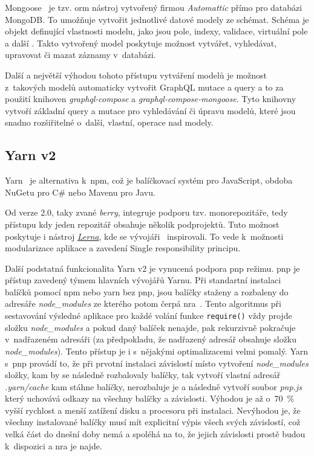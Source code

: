 Mongoose~\cite{automatticinc_2011_mongoose} je tzv. \acrfull{orm} nástroj vytvořený firmou \emph{Automattic} přímo pro databázi MongoDB. To umožňuje vytvořit jednotlivé datové modely ze schémat. Schéma je objekt definující vlastnosti modelu, jako jsou pole, indexy, validace, virtuální pole a další \cite{automatticinc_2020_mongoose}. Takto vytvořený model poskytuje možnost vytvářet, vyhledávat, upravovat či mazat záznamy v~databázi.

Další a největší výhodou tohoto přístupu vytváření modelů je možnost z~takových modelů automaticky vytvořit GraphQL mutace a query a to za použití knihoven \emph{graphql-compose} a \emph{graphql-compose-mongoose}. Tyto knihovny vytvoří základní query a mutace pro vyhledávání či úpravu modelů, které jsou snadno rozšiřitelné o~další, vlastní, operace nad modely.

\subsection{Yarn v2}
\label{ss:yarn}
Yarn~\cite{facebookinc_2019_yarn} je alternativa k~\acrshort{npm}, což je balíčkovací systém pro JavaScript, obdoba NuGetu pro C\# nebo Mavenu pro Javu.

Od verze 2.0, taky zvané \emph{berry}, integruje podporu tzv. monorepozitáře, tedy přístupu kdy jeden repozitář obsahuje několik podprojektů. Tuto možnost poskytuje i nástroj \href{https://github.com/lerna/lerna}{\emph{Lerna}}, kde se vývojáři~ inspirovali. To vede k~možnosti modularizace aplikace a zavedení Single responsibility principu.

Další podstatná funkcionalita Yarn v2 je vynucená podpora \acrfull{pnp} režimu. \acrshort{pnp} je přístup zavedený týmem hlavních vývojářů Yarnu. Při standartní instalaci balíčků pomocí npm nebo yarn bez pnp, jsou balíčky staženy a rozbaleny do adresáře \emph{node\_modules} ze kterého potom čerpá \acrfull{nra}~\cite{joyentinc_1_noderesolutionalgorithm}. Tento algoritmus při sestavování výsledné aplikace pro každé volání funkce \texttt{require()} vždy projde složku \emph{node\_modules} a pokud daný balíček nenajde, pak rekurzivně pokračuje v~nadřazeném adresáři (za předpokladu, že nadřazený adresář obsahuje složku \emph{node\_modules}). Tento přístup je i s~nějakými optimalizacemi velmi pomalý. Yarn s~\acrshort{pnp} provádí to, že při prvotní instalaci závislostí místo vytvoření \emph{node\_modules} složky, kam by se následně rozbalovaly balíčky, tak vytvoří vlastní adresář \emph{.yarn/cache} kam stáhne balíčky, nerozbaluje je a následně vytvoří soubor \emph{pnp.js} který uchovává odkazy na všechny balíčky a závislosti. Výhodou je až o~70~\% vyšší rychlost a menší zatížení disku a procesoru při instalaci. Nevýhodou je, že všechny instalované balíčky musí mít explicitní výpis všech svých závislostí, což velká část do dnešní doby nemá a spoléhá na to, že jejich závislosti prostě budou k~dispozici a \acrshort{nra} je najde.

